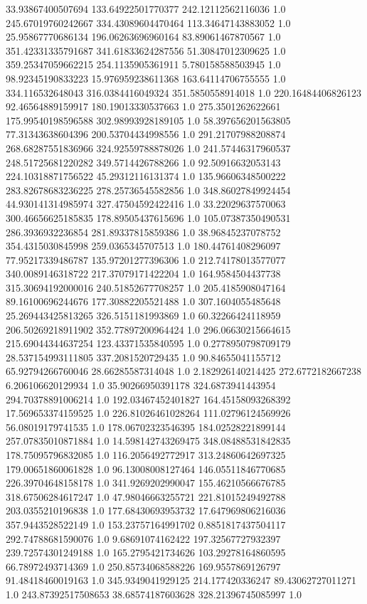 33.93867400507694	133.64922501770377	242.12112562116036	1.0
245.67019760242667	334.43089604470464	113.34647143883052	1.0
25.95867770686134	196.06263696960164	83.89061467870567	1.0
351.42331335791687	341.61833624287556	51.30847012309625	1.0
359.25347059662215	254.1135905361911	5.780158588503945	1.0
98.92345190833223	15.976959238611368	163.64114706755555	1.0
334.116532648043	316.0384416049324	351.5850558914018	1.0
220.16484406826123	92.46564889159917	180.19013330537663	1.0
275.3501262622661	175.99540198596588	302.98993928189105	1.0
58.397656201563805	77.31343638604396	200.53704434998556	1.0
291.21707988208874	268.68287551836966	324.92559788878026	1.0
241.57446317960537	248.51725681220282	349.5714426788266	1.0
92.50916632053143	224.10318871756522	45.29312116131374	1.0
135.96606348500222	283.82678683236225	278.25736545582856	1.0
348.86027849924454	44.930141314985974	327.47504592422416	1.0
33.22029637570063	300.46656625185835	178.89505437615696	1.0
105.07387350490531	286.3936932236854	281.89337815859386	1.0
38.96845237078752	354.4315030845998	259.0365345707513	1.0
180.44761408296097	77.95217339486787	135.97201277396306	1.0
212.74178013577077	340.0089146318722	217.37079171422204	1.0
164.9584504437738	315.30694192000016	240.51852677708257	1.0
205.4185908047164	89.16100696244676	177.30882205521488	1.0
307.1604055485648	25.269443425813265	326.5151181993869	1.0
60.32266424118959	206.50269218911902	352.77897200964424	1.0
296.06630215664615	215.69044344637254	123.43371535840595	1.0
0.2778950798709179	28.537154993111805	337.2081520729435	1.0
90.84655041155712	65.92794266760046	28.66285587314048	1.0
2.182926140214425	272.6772182667238	6.206106620129934	1.0
35.90266950391178	324.6873941443954	294.70378891006214	1.0
192.03467452401827	164.45158093268392	17.569653374159525	1.0
226.81026461028264	111.02796124569926	56.08019179741535	1.0
178.06702323546395	184.02528221899144	257.07835010871884	1.0
14.598142743269475	348.08488531842835	178.75095796832085	1.0
116.2056492772917	313.24860642697325	179.00651860061828	1.0
96.13008008127464	146.05511846770685	226.39704648158178	1.0
341.9269202990047	155.46210566676785	318.67506284617247	1.0
47.98046663255721	221.81015249492788	203.0355210196838	1.0
177.68430693953732	17.647969806216036	357.9443528522149	1.0
153.23757164991702	0.8851817437504117	292.74788681590076	1.0
9.68691074162422	197.32567727932397	239.72574301249188	1.0
165.2795421734626	103.29278164860595	66.78972493714369	1.0
250.85734068588226	169.9557869126797	91.48418460019163	1.0
345.9349041929125	214.177420336247	89.43062727011271	1.0
243.87392517508653	38.68574187603628	328.21396745085997	1.0
